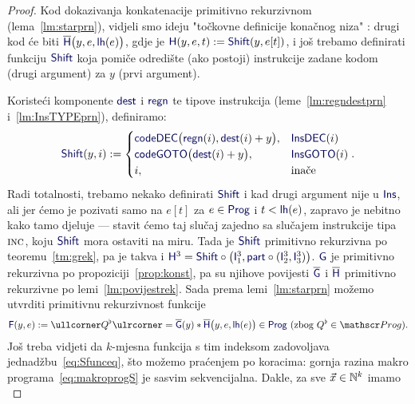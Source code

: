 \begin{proof}
Kod dokazivanja konkatenacije primitivno rekurzivnom (lema~\ref{lm:starprn}), vidjeli smo ideju "točkovne definicije konačnog niza"%
: drugi kod će biti $\overline{\f H}\bigl(y,e,\f{lh}(e)\bigr)$, gdje je $\f H(y,e,t):=\f{Shift}(y,e[t])$, i još trebamo definirati funkciju $\f{Shift}$ koja pomiče odredište (ako postoji) instrukcije zadane kodom (drugi argument) za $y$ (prvi argument).

Koristeći komponente $\f{dest}$ i $\f{regn}$ te tipove instrukcija (leme~\ref{lm:regndestprn} i~\ref{lm:InsTYPEprn}), definiramo:
\begin{equation}
    \f{Shift}(y,i):=\begin{cases}
        \f{codeDEC}\bigl(\f{regn}(i),\f{dest}(i)+y\bigr),&\f{InsDEC}(i)\\
        \f{codeGOTO}\bigl(\f{dest}(i)+y\bigr),&\f{InsGOTO}(i)\\
        i,&\text{inače}
    \end{cases}\text.
\end{equation}
	Radi totalnosti, trebamo nekako definirati $\f{Shift}$ i kad drugi argument nije u $\f{Ins}$, ali jer ćemo je pozivati samo na $e[t]$ za $e\in\f{Prog}$ i $t<\f{lh}(e)$, zapravo je nebitno kako tamo djeluje --- stavit ćemo taj slučaj zajedno sa slučajem instrukcije tipa $\textsc{inc}$, koju $\f{Shift}$ mora ostaviti na miru. Tada je $\f{Shift}$ primitivno rekurzivna po teoremu~\ref{tm:grek}, pa je takva i $\f H^3=\f{Shift}\circ\bigl(\f I_1^3,\f{part}\circ(\f I_2^3,\f I_3^3)\bigr)$. $\f G$ je primitivno rekurzivna po propoziciji~\ref{prop:konst}, pa su njihove povijesti $\overline{\f G}$ i $\overline{\f H}$ primitivno rekurzivne po lemi~\ref{lm:povijestrek}. Sada prema lemi~\ref{lm:starprn} %
 možemo utvrditi primitivnu rekurzivnost funkcije
\begin{equation}
    \f F(y,e):=\kprog{Q^\flat}=\overline{\f G}(y)*\overline{\f H}\bigl(y,e,\f{lh}(e)\bigr)
	\in\f{Prog} \text{ (zbog $Q^\flat\in\mathscr Prog$).}
\end{equation}
Još treba vidjeti da $k$-mjesna funkcija s tim indeksom zadovoljava jednadžbu~\eqref{eq:Sfunceq}, što možemo praćenjem po koracima: gornja razina makro programa~\eqref{eq:makroprogS} je sasvim sekvencijalna. Dakle, za sve $\vec x\in{\mathbb N}^k$ imamo
	\vspace{-1em}
\begin{equation}

\end{equation}
\end{proof}
